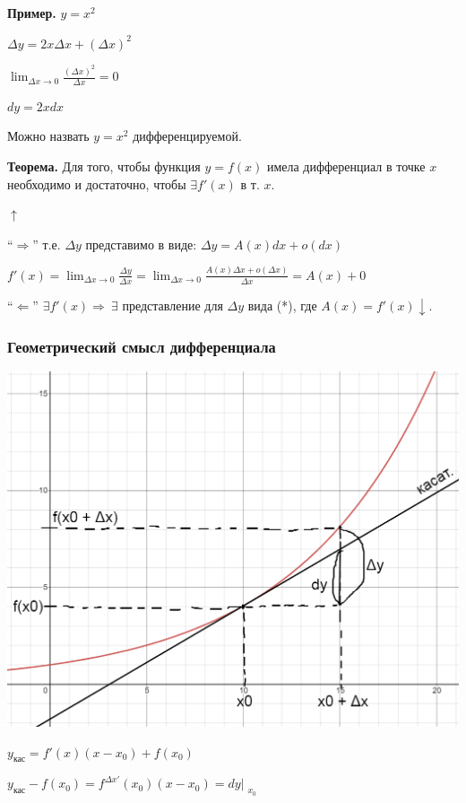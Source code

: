 \documentclass{article}
\begin{document}
    \textbf{Пример.} \( y = x^2 \)

    \( \Delta y = 2x\Delta x + (\Delta x)^2 \)

    \( \lim_{\Delta x \to 0} \frac{(\Delta x)^2}{\Delta x} = 0 \)

    \( dy = 2xdx \)
    
    Можно назвать \( y = x^2 \) дифференцируемой.

    \textbf{Теорема.} Для того, чтобы функция \( y = f(x) \) имела дифференциал в точке \(x\) необходимо и достаточно, чтобы \(\exists f'(x)\) в т. \(x\).

    \(\uparrow\)

    ``\( \Rightarrow \)'' т.е. \( \Delta y \) представимо в виде: \( \Delta y = A(x)dx + o(dx) \)

    \(f'(x) = \lim_{\Delta x \to 0}\frac{\Delta y}{\Delta x} = \lim_{\Delta x \to 0}\frac{A(x)\Delta x + o(\Delta x)}{\Delta x} = A(x) + 0 \)

    ``\( \Leftarrow \)'' \(\exists f'(x) \Rightarrow\ \exists \) представление для \(\Delta y\) вида (*), где \(A(x) = f'(x) \downarrow\).

    \subsubsection{Геометрический смысл дифференциала}

    \includegraphics[scale=0.3]{11_1_9_2.png}

    \( y_{\textrm{кас}} = f'(x)(x - x_0) + f(x_0) \)

    \( y_{\textrm{кас}} - f(x_0) = f^{\Delta x'}(x_0)(x - x_0) = dy\Bigr|_{\substack{x_0}} \)
\end{document}
